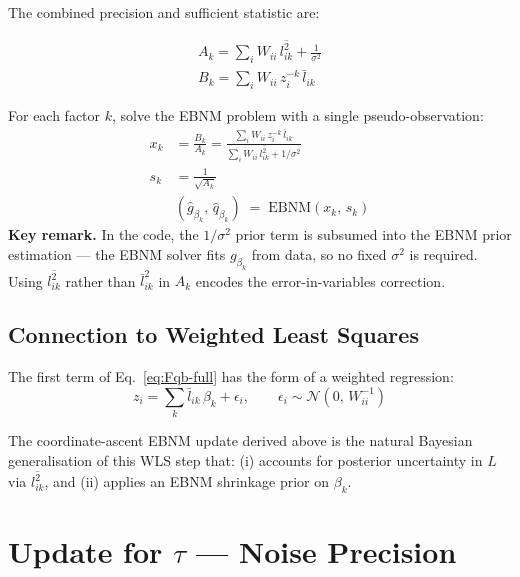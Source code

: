 \documentclass[11pt]{article}
\newcommand{\lbar}[2]{\bar{l}_{#1#2}}
\newcommand{\lsec}[2]{\overline{l^2_{#1#2}}}
\begin{document}
The combined precision and sufficient statistic are:

\begin{align}
  \boxed{A_k = \sum_i W_{ii}\,\lsec{i}{k} + \frac{1}{\sigma^2}}
  \label{eq:A-beta}\\[4pt]
  \boxed{B_k = \sum_i W_{ii}\,z^{-k}_i\,\lbar{i}{k}}
  \label{eq:B-beta}
\end{align}

\begin{ebnmbox}
For each factor $k$, solve the EBNM problem with a single pseudo-observation:
\begin{align}
  x_k &= \frac{B_k}{A_k}
       = \frac{\displaystyle\sum_i W_{ii}\,z^{-k}_i\,\lbar{i}{k}}
              {\displaystyle\sum_i W_{ii}\,\lsec{i}{k} + 1/\sigma^2}
  \label{eq:xk-beta}\\[6pt]
  s_k &= \frac{1}{\sqrt{A_k}} \label{eq:sk-beta}\\[6pt]
  &(\hat{g}_{\beta_k},\, \hat{q}_{\beta_k}) \;=\; \mathrm{EBNM}(x_k,\, s_k)
\end{align}
\textbf{Key remark.} In the code, the $1/\sigma^2$ prior term is subsumed into
the EBNM prior estimation --- the EBNM solver fits $g_{\beta_k}$ from data,
so no fixed $\sigma^2$ is required.  Using $\lsec{i}{k}$ rather than
$\lbar{i}{k}^2$ in $A_k$ encodes the error-in-variables correction.
\end{ebnmbox}

\subsection{Connection to Weighted Least Squares}

The first term of Eq.~\eqref{eq:Fqb-full} has the form of a weighted
regression:
\[
  z_i = \sum_k \lbar{i}{k}\,\beta_k + \epsilon_i,
  \qquad \epsilon_i \sim \mathcal{N}\!\left(0,\,W_{ii}^{-1}\right)
\]

The coordinate-ascent EBNM update derived above is the natural Bayesian
generalisation of this WLS step that: (i) accounts for posterior uncertainty in
$L$ via $\lsec{i}{k}$, and (ii) applies an EBNM shrinkage prior on $\beta_k$.

\section{Update for $\tau$ --- Noise Precision}\label{sec:tau}
\end{document}
